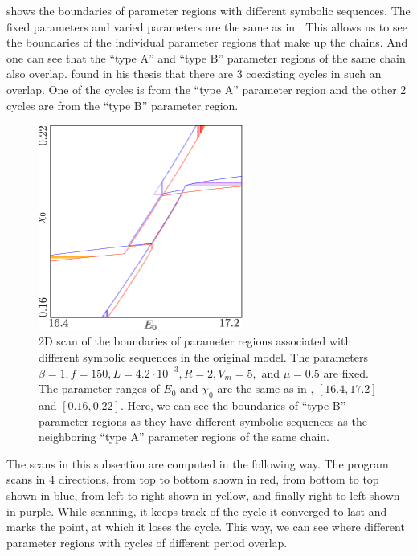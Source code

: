  shows the boundaries of parameter regions with different symbolic sequences.
The fixed parameters and varied parameters are the same as in .
This allows us to see the boundaries of the individual parameter regions that make up the chains.
And one can see that the ``type A'' and ``type B'' parameter regions of the same chain also overlap.
 found in his thesis that there are 3 coexisting cycles in such an overlap.
One of the cycles is from the ``type A'' parameter region and the other 2 cycles are from the ``type B'' parameter region.

\begin{figure}
	\centering
	\includegraphics[width=0.6\textwidth]{../Figures/2/2.6/result.png}
	\caption[2D scan of the boundaries of parameter regions associated with different symbolic sequences in the original model]{
		2D scan of the boundaries of parameter regions associated with different symbolic sequences in the original model.
		The parameters $\beta = 1, f = 150, L = 4.2 \cdot 10^{-3}, R = 2, V_m = 5,$ and $\mu = 0.5$ are fixed.
		The parameter ranges of $E_0$ and $\chi_0$ are the same as in , $[16.4, 17.2]$ and $[0.16, 0.22]$.
		Here, we can see the boundaries of ``type B'' parameter regions as they have different symbolic sequences as the neighboring ``type A'' parameter regions of the same chain.
	}
	\label{fig:etup.og.overlapping.regions.zoomed}
\end{figure}

The scans in this subsection are computed in the following way.
The program scans in 4 directions, from top to bottom shown in red, from bottom to top shown in blue, from left to right shown in yellow, and finally right to left shown in purple.
While scanning, it keeps track of the cycle it converged to last and marks the point, at which it loses the cycle.
This way, we can see where different parameter regions with cycles of different period overlap.

